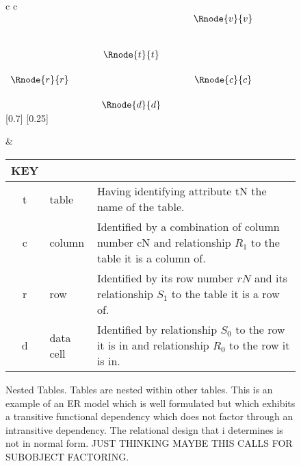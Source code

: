 \begin{figure} [h] %
\begin{center}
\begin{tabular}{c c}
$
\begin{array}{cp{0.5cm}cp{0.5cm}cp{0.3cm}c}
            &&              && \Rnode{v}{v} &&              \\[0.9cm]
            && \Rnode{t}{t} &&              &&              \\[0.5cm] 
\Rnode{r}{r}&&              && \Rnode{c}{c} &&              \\[0.5cm]     
	          && \Rnode{d}{d} &&              &&               
\end{array}
$
[0.7]
\idcomp
{} 
\idcomp
{} 
\idcomp
{}
\idcomp
{}
\idcomp
{}
\idcomp
[0.25]
\idcomp

& \footnotesize
\begin{tabular}{c p{1.5cm} p{3cm}}
KEY && \\
\hline
t & table & Having identifying attribute tN the name of the table. \\
c & column & Identified by a combination of column number cN and relationship $R_1$ to the table it is a column of.\\
r & row & Identified by its row number $rN$ and its relationship $S_1$ to the table it is a row of.\\
d & data cell & Identified by relationship $S_0$ to the row it is in and relationship $R_0$ to the row it is in. \\
\end{tabular} 
\end{tabular}
\end{center}
\caption{Nested Tables. Tables are nested within other tables. This is an example of an ER model which is well formulated but which exhibits a transitive functional dependency which does not factor through an intransitive dependency. The relational design that i determines is not 
in normal form. JUST THINKING MAYBE THIS CALLS FOR SUBOBJECT FACTORING.
}
\label{datatablegraph}
\end{figure}

